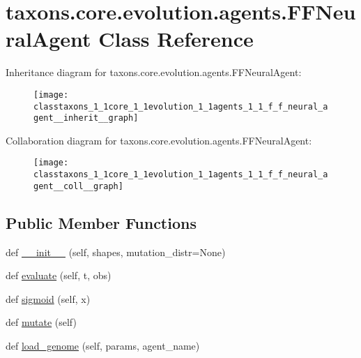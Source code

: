 \hypertarget{classtaxons_1_1core_1_1evolution_1_1agents_1_1_f_f_neural_agent}{}\section{taxons.\+core.\+evolution.\+agents.\+F\+F\+Neural\+Agent Class Reference}
\label{classtaxons_1_1core_1_1evolution_1_1agents_1_1_f_f_neural_agent}


Inheritance diagram for taxons.\+core.\+evolution.\+agents.\+F\+F\+Neural\+Agent\+:
\nopagebreak
\begin{figure}[H]
\begin{center}
\leavevmode
\texttt{[image: classtaxons\_1\_1core\_1\_1evolution\_1\_1agents\_1\_1\_f\_f\_neural\_agent\_\_inherit\_\_graph]}
\end{center}
\end{figure}


Collaboration diagram for taxons.\+core.\+evolution.\+agents.\+F\+F\+Neural\+Agent\+:
\nopagebreak
\begin{figure}[H]
\begin{center}
\leavevmode
\texttt{[image: classtaxons\_1\_1core\_1\_1evolution\_1\_1agents\_1\_1\_f\_f\_neural\_agent\_\_coll\_\_graph]}
\end{center}
\end{figure}
\subsection*{Public Member Functions}
\begin{DoxyCompactItemize}
\item 
def \hyperlink{classtaxons_1_1core_1_1evolution_1_1agents_1_1_f_f_neural_agent_ad048864ff91e519ee4127ce011fdbdb9}{\+\_\+\+\_\+init\+\_\+\+\_\+} (self, shapes, mutation\+\_\+distr=None)
\item 
def \hyperlink{classtaxons_1_1core_1_1evolution_1_1agents_1_1_f_f_neural_agent_a0ed106916e4a7f92f117dd79a3c05faf}{evaluate} (self, t, obs)
\item 
def \hyperlink{classtaxons_1_1core_1_1evolution_1_1agents_1_1_f_f_neural_agent_ac5844281ca9599579b360d5879c18843}{sigmoid} (self, x)
\item 
def \hyperlink{classtaxons_1_1core_1_1evolution_1_1agents_1_1_f_f_neural_agent_a34bb5dfaf08d1576a0962eab55437dad}{mutate} (self)
\item 
def \hyperlink{classtaxons_1_1core_1_1evolution_1_1agents_1_1_f_f_neural_agent_a573752f1ce310965576f8910fb9d6e73}{load\+\_\+genome} (self, params, agent\+\_\+name)
\end{DoxyCompactItemize}
